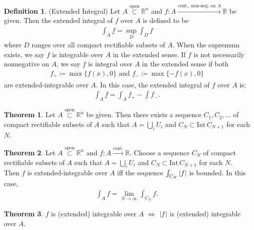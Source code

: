 \documentclass{article}
\theoremstyle{definition}
\newtheorem{defn}{Definition}[section]
\newtheorem{thm}{Theorem}[section]
\begin{document}
\begin{defn}
    (Extended Integral) Let $A\overset{\text{open}}{\subset} \mathbb{R}^n$ and $f:A \xrightarrow{\text{cont., non-neg. on } A } \mathbb{R}$ be given. Then the extended integral of $f$ over $A$ is defined to be
    \begin{align*}
        \int_A f = \sup_D \int_D f
    \end{align*}
    where $D$ ranges over all compact rectifiable subsets of $A$. When the supremum exists, we say $f$ is integrable over $A$ in the extended sense. If $f$ is not necessarily nonnegative on $A$, we say $f$ is integral over $A$ in the extended sense if both 
    \begin{align*}
        f_+ \coloneqq \max\{ f(x),0 \} \text{ and } f_- \coloneqq \max\{ -f(x),0 \}
    \end{align*}
     are extended-integrable over $A$. In this case, the extended integral of $f$ over $A$ is:
    \begin{align*}
        \int_A f = \int_A f_+ - \int f_-.
    \end{align*}
\end{defn}






\begin{thm}
    Let $A \overset{\text{open}}{\subset} \mathbb{R}^n$ be given. Then there exists a sequence $C_1,C_2,\dots$ of compact rectifiable subsets of $A$ such that $A = \bigcup_i U_i$ and $C_N \subset \text{Int}\,C_{N+1}$ for each $N$. 
\end{thm}




\begin{thm}
    Let $A\overset{\text{open}}{\subset} \mathbb{R}^n$ and $f: A \xrightarrow{\text{cont.}} \mathbb{R}$. Choose a sequence $C_N$ of compact rectifiable subsets of $A$ such that $A = \bigcup_i U_i$ and $C_N \subset \text{Int}\,C_{N+1}$ for each $N$. Then $f$ is extended-integrable over $A$ iff the sequence $\int_{C_N}\abs{f}$ is bounded. In this case, 
    \begin{align*}
        \int_A f = \lim\limits_{N\to \infty} \int_{C_N} f.
    \end{align*}
\end{thm}



\begin{thm}
    $f$ is (extended) integrable over $A$ $\iff$ $\abs{f}$ is (extended) integrable over $A$. 
\end{thm}
\end{document}
